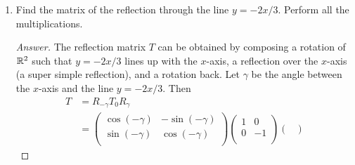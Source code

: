 \documentclass[../psets.tex]{subfiles}
\begin{document}
\begin{enumerate}[label={\textbf{5.\arabic*.}}]
\begin{proof}[Answer]
\begin{align*}
\begin{pmatrix}
                0 & 0\\
            \end{pmatrix}&
            B &=
            \begin{pmatrix}
                1 & 0\\
                -1 & 0\\
            \end{pmatrix}
        \end{align*}
        Then
        \begin{align*}
            AB &=
            \begin{pmatrix}
                0 & 0\\
                0 & 0\\
            \end{pmatrix}&
            BA &=
            \begin{pmatrix}
                1 & 1\\
                -1 & -1\\
            \end{pmatrix}
        \end{align*}
    \end{proof}
    \setcounter{enumi}{7}
    \item Find the matrix of the reflection through the line $y=-2x/3$. Perform all the multiplications.
    \begin{proof}[Answer]
        The reflection matrix $T$ can be obtained by composing a rotation of $\mathbb{R}^2$ such that $y=-2x/3$ lines up with the $x$-axis, a reflection over the $x$-axis (a super simple reflection), and a rotation back. Let $\gamma$ be the angle between the $x$-axis and the line $y=-2x/3$. Then
        \begingroup
        \renewcommand{\arraystretch}{1.4}
        \begin{align*}
            T &= R_{-\gamma}T_0R_\gamma\\
            &=
            \begin{pmatrix}
                \cos(-\gamma) & -\sin(-\gamma)\\
                \sin(-\gamma) & \cos(-\gamma)\\
            \end{pmatrix}
            \begin{pmatrix}
                1 & 0\\
                0 & -1\\
            \end{pmatrix}
            \begin{pmatrix}

\end{pmatrix}
\end{align*}
\end{proof}
\end{enumerate}
\end{document}
